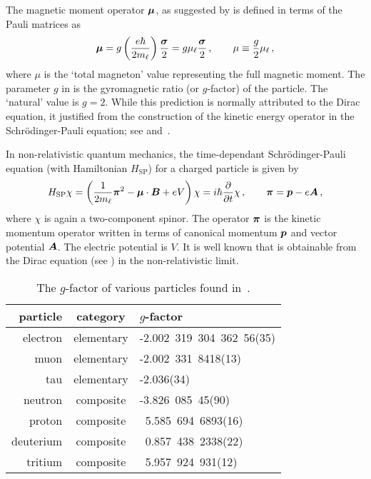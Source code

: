 The magnetic moment operator $\boldsymbol{\mu}$, as suggested by  is defined in terms of the Pauli matrices as
\begin{gather}
    \label{mag:3}
    \boldsymbol{\mu}=g\left(\frac{e\hbar}{2m_{\ell}}\right)\frac{\boldsymbol{\sigma}}{2}=g\mu_{\ell}\frac{\boldsymbol{\sigma}}{2}\,,\qquad\mu\equiv\frac{g}{2}\mu_{\ell}\,,
\end{gather}
where $\mu$ is the `total magneton' value representing the full magnetic moment. The parameter $g$ in  is the gyromagnetic ratio (or $g$-factor) of the particle. The `natural' value is $g\!=\!2$. While this prediction is normally attributed to the Dirac equation, it justified from the construction of the kinetic energy operator in the Schr{\"o}dinger-Pauli equation; see  and~\cite{sakurai1967advanced}.

In non-relativistic quantum mechanics, the time-dependant Schr{\"o}dinger-Pauli equation (with Hamiltonian $H_\mathrm{SP}$) for a charged particle is given by
\begin{gather}
	\label{sp:1}
    {H}_{\mathrm{SP}}\chi=\left(\frac{1}{2m_{\ell}}\boldsymbol{\pi}^{2}-\boldsymbol{\mu}\cdot\boldsymbol{B}+e{ V}\right)\chi=i\hbar\frac{\partial}{\partial t}\chi\,,\qquad
    \boldsymbol{\pi}=\boldsymbol{ p}-e{\boldsymbol{A}}\,,
\end{gather}
where $\chi$ is again a two-component spinor. The operator $\boldsymbol{\pi}$ is the kinetic momentum operator written in terms of canonical momentum $\boldsymbol{p}$ and vector potential $\boldsymbol{A}$. The electric potential is $V$. It is well known that  is obtainable from the Dirac equation (see ) in the non-relativistic limit. 

\begin{table}
	\centering
\begin{tabular}{r|c|l}
    particle & category & $g$-factor\\
    \hline
	electron & elementary & -2.002\ 319\ 304\ 362\ 56(35)\\
	muon & elementary & -2.002\ 331\ 8418(13)\\
	tau & elementary & -2.036(34)\\
	neutron & composite & -3.826\ 085\ 45(90)\\
	proton & composite & \ 5.585\ 694\ 6893(16)\\
	deuterium & composite & \ 0.857\ 438\ 2338(22)\\
	tritium & composite & \ 5.957\ 924\ 931(12)\\
\end{tabular}
	\caption{The $g$-factor of various particles found in~\cite{ParticleDataGroup:2022pth}.}
	\label{tab:gfactor}
\end{table}

